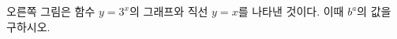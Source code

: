\noindent\begin{minipage}[t]{0.58\linewidth}\vspace{0pt}\raggedright 오른쪽 그림은 함수 $y=3^{x}$의 그래프와 직선 $y=x$를 나타낸 것이다. 이때 $b^{a}$의 값을 구하시오. \end{minipage}\hfill\begin{minipage}[t]{0.4\linewidth}\vspace{0pt}\centering \resizebox{\ifdim\width>\linewidth\linewidth\else\width\fi}{!}{}\end{minipage}\par
